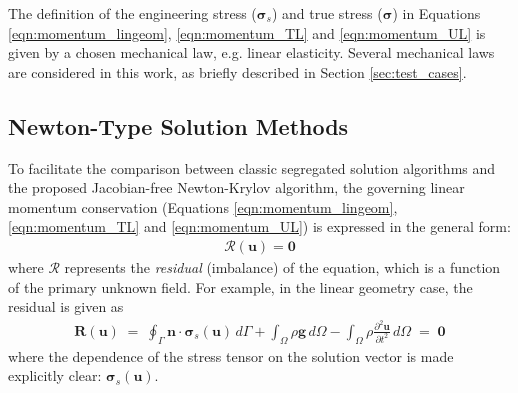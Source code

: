 \documentclass[sn-mathphys,Numbered]{sn-jnl}%
\newcommand{\bb}{\boldsymbol}
\begin{document}



The definition of the engineering stress ($\bb{\sigma}_s$) and true stress ($\bb{\sigma}$) in Equations \ref{eqn:momentum_lingeom}, \ref{eqn:momentum_TL} and \ref{eqn:momentum_UL} is given by a chosen mechanical law, e.g. linear elasticity.
Several mechanical laws are considered in this work, as briefly described in Section \ref{sec:test_cases}.



\subsection{Newton-Type Solution Methods}
To facilitate the comparison between classic segregated solution algorithms and the proposed Jacobian-free Newton-Krylov algorithm, the governing linear momentum conservation (Equations \ref{eqn:momentum_lingeom}, \ref{eqn:momentum_TL} and \ref{eqn:momentum_UL}) is expressed in the general form:
\begin{eqnarray} \label{eqn:residual}
	\mathcal{R}(\bb{u}) = \bb{0}
\end{eqnarray}
where $\mathcal{R}$ represents the \emph{residual} (imbalance) of the equation, which is a function of the primary unknown field.
For example, in the linear geometry case, the residual is given as
\begin{eqnarray}
    \bb{R}(\bb{u})
    \;=\;
    \oint_{\Gamma} \bb{n} \cdot \bb{\sigma}_s(\bb{u}) \,  d\Gamma
    + \int_{\Omega}  \rho \bb{g} \, d\Omega
    -  \int_{\Omega} \rho \frac{\partial^2 \bb{u} }{\partial t^2} \, d\Omega
    \;=\; \bb{0}
\end{eqnarray}
where the dependence of the stress tensor on the solution vector is made explicitly clear: $\bb{\sigma}_s(\bb{u})$.
\end{document}
